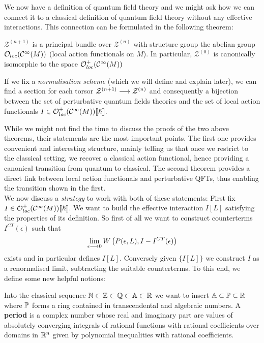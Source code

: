 We now have a definition of quantum field theory and we might ask how we can connect it to a classical definition of quantum field theory without any effective interactions. This connection can be formulated in the following theorem:

\begin{theo}
  $\mathcal{Z}^{(n+1)}$ is a principal bundle over $\mathcal{Z}^{(n)}$ with structure group the abelian group $\mathcal{O}_{loc}(\mathcal{C}^{\infty}(M))$ (local action functionals on $M$). In particular, $\mathcal{Z}^{(0)}$ is canonically isomorphic to the space $\mathcal{O}^+_{loc}(\mathcal{C}^{\infty}(M))$
\end{theo}

\begin{theo}
  If we fix a \emph{normalisation scheme} (which we will define and explain later), we can find a section for each torsor $\mathcal{Z}^{(n+1)} \longrightarrow \mathcal{Z}^{(n)}$ and consequently a bijection between the set of perturbative quantum fields theories and the set of local action functionals $I \in \mathcal{O}^+_{loc}(\mathcal{C}^{\infty}(M))\llbracket \hbar \rrbracket$.
\end{theo}

While we might not find the time to discuss the proofs of the two above theorems, their statements are the most important points. The first one provides convenient and interesting structure, mainly telling us that once we restrict to the classical setting, we recover a classical action functional, hence providing a canonical transition from quantum to classical. The second theorem provides a direct link between local action functionals and perturbative QFTs, thus enabling the transition shown in the first.\\

We now discuss a \textit{strategy} to work with both of these statements: First fix $I \in \mathcal{O}^+_{loc}(\mathcal{C}^{\infty}(M))\llbracket \hbar \rrbracket$. We want to build the effective interaction $I[L]$ satisfying the properties of its definition. So first of all we want to construct counterterms $I^{CT}(\epsilon)$ such that
$$ \lim_{\epsilon \lra 0} W\left(P(\epsilon,L), I-I^{CT}(\epsilon)\right)$$
exists and in particular defines $I[L]$. Conversely given $\{I[L]\}$ we construct $I$ as a renormalised limit, subtracting the suitable counterterms. To this end, we define some new helpful notions:

\begin{definition}[Periods]
  Into the classical sequence $\mathbb{N} \subset \mathbb{Z} \subset \mathbb{Q} \subset \mathbb{A} \subset \mathbb{R}$ we want to insert $\mathbb{A} \subset \mathbb{P} \subset \mathbb{R}$ where $\mathbb{P}$ forms a ring contained in transcendental and algebraic numbers. A \textbf{period} is a complex number whose real and imaginary part are values of absolutely converging integrals of rational functions with rational coefficients over domains in $\mathbb{R}^n$ given by polynomial inequalities with rational coefficients.
\end{definition}


